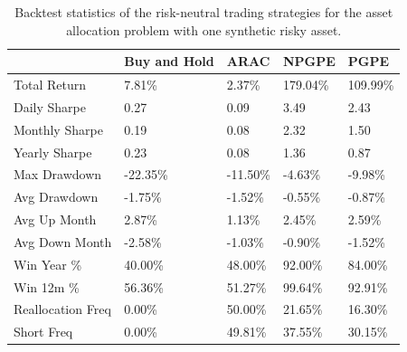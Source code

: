 \begin{table}[t!]
\centering
\begin{tabular}{@{}lllll@{}}
\toprule
                  & Buy and Hold & ARAC     & NPGPE    & PGPE     \\ \midrule
Total Return      & 7.81\%       & 2.37\%   & 179.04\% & 109.99\% \\
Daily Sharpe      & 0.27         & 0.09     & 3.49     & 2.43     \\
Monthly Sharpe    & 0.19         & 0.08     & 2.32     & 1.50     \\
Yearly Sharpe     & 0.23         & 0.08     & 1.36     & 0.87     \\
Max Drawdown      & -22.35\%     & -11.50\% & -4.63\%  & -9.98\%  \\
Avg Drawdown      & -1.75\%      & -1.52\%  & -0.55\%  & -0.87\%  \\
Avg Up Month      & 2.87\%       & 1.13\%   & 2.45\%   & 2.59\%   \\
Avg Down Month    & -2.58\%      & -1.03\%  & -0.90\%  & -1.52\%  \\
Win Year \%       & 40.00\%      & 48.00\%  & 92.00\%  & 84.00\%  \\
Win 12m \%        & 56.36\%      & 51.27\%  & 99.64\%  & 92.91\%  \\
Reallocation Freq & 0.00\%       & 50.00\%  & 21.65\%  & 16.30\%  \\
Short Freq        & 0.00\%       & 49.81\%  & 37.55\%  & 30.15\%  \\ \bottomrule
\end{tabular}
\caption[Risk-neutral backtest statistics with one synthetic risky asset]{Backtest statistics of the risk-neutral trading strategies for the asset allocation problem with one synthetic risky asset.}
\label{tab:single_synthetic_neutral_performance}
\end{table}

